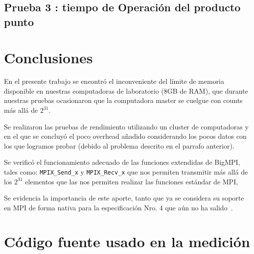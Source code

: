 \documentclass[conference]{IEEEtran}
\begin{document}
\subsection{Prueba 3 : tiempo de Operación del producto punto}
\begin{table}[htb]
\caption{Algoritmo de prueba con 2GB de carga}
\label{1234}
\end{table}

\section{Conclusiones}
En el presente trabajo se encontró el inconveniente del límite de memoria disponible
en nuestras computadoras de laboratorio (8GB de RAM), que durante nuestras pruebas
ocasionaron que la computadora master se cuelgue con counts más allá de $2^{31}$.

Se realizaron las pruebas de rendimiento utilizando un cluster
de computadoras y en el que se concluyó el poco overhead añadido considerando los pocos
datos con los que logramos probar (debido al problema descrito en el parrafo anterior).

Se verificó el funcionamiento adecuado de las funciones extendidas de BigMPI,
tales como: \texttt{MPIX\_Send\_x}
y \texttt{MPIX\_Recv\_x} que nos permiten transmitir más allá de los $2^{31}$ elementos
que las  nos permiten realizar las funciones estándar de MPI,

Se evidencia la importancia de este aporte, tanto que ya se considera su soporte en MPI de forma
nativa para la especificación Nro. 4 que aún no ha salido~\cite{mpi4}.


\onecolumn
\appendices
\section{Código fuente usado en la medición}






\clearpage
\newpage
\twocolumn
\end{document}
